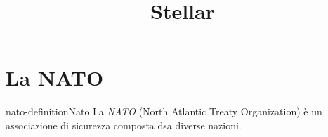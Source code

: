 \documentclass[preview]{standalone}
\begin{document}
\title{Stellar}
\genpage

\section{La NATO}

\begin{snippetdefinition}{nato-definition}{Nato}
    La \textit{NATO} (North Atlantic Treaty Organization) è un associazione di sicurezza composta dsa diverse nazioni.
\end{snippetdefinition}
\end{document}
